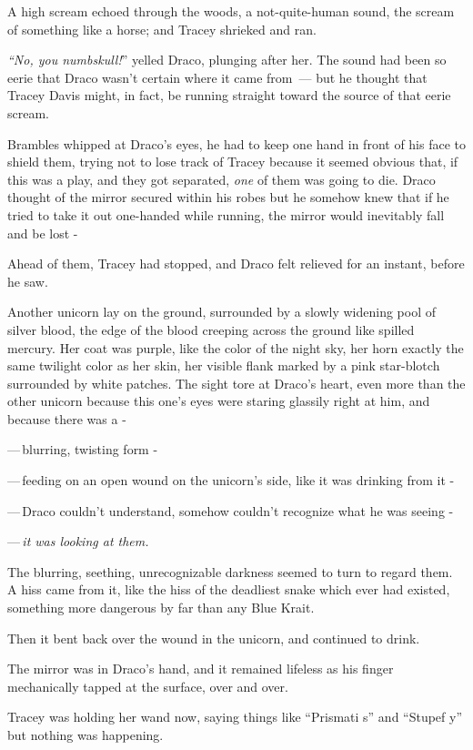 A high scream echoed through the woods, a not-quite-human sound, the scream of something like a horse; and Tracey shrieked and ran.

\emph{``No, you numbskull!}'' yelled Draco, plunging after her. The sound had been so eerie that Draco wasn't certain where it came from~--- but he thought that Tracey Davis might, in fact, be running straight toward the source of that eerie scream.

Brambles whipped at Draco's eyes, he had to keep one hand in front of his face to shield them, trying not to lose track of Tracey because it seemed obvious that, if this was a play, and they got separated, \emph{one} of them was going to die. Draco thought of the mirror secured within his robes but he somehow knew that if he tried to take it out one-handed while running, the mirror would inevitably fall and be lost -

Ahead of them, Tracey had stopped, and Draco felt relieved for an instant, before he saw.

Another unicorn lay on the ground, surrounded by a slowly widening pool of silver blood, the edge of the blood creeping across the ground like spilled mercury. Her coat was purple, like the color of the night sky, her horn exactly the same twilight color as her skin, her visible flank marked by a pink star-blotch surrounded by white patches. The sight tore at Draco's heart, even more than the other unicorn because this one's eyes were staring glassily right at him, and because there was a -

---\,blurring, twisting form -

---\,feeding on an open wound on the unicorn's side, like it was drinking from it -

---\,Draco couldn't understand, somehow couldn't recognize what he was seeing -

---\,\emph{it was looking at them.}

The blurring, seething, unrecognizable darkness seemed to turn to regard them. A hiss came from it, like the hiss of the deadliest snake which ever had existed, something more dangerous by far than any Blue Krait.

Then it bent back over the wound in the unicorn, and continued to drink.

The mirror was in Draco's hand, and it remained lifeless as his finger mechanically tapped at the surface, over and over.

Tracey was holding her wand now, saying things like ``Prismati s'' and ``Stupef y'' but nothing was happening.

